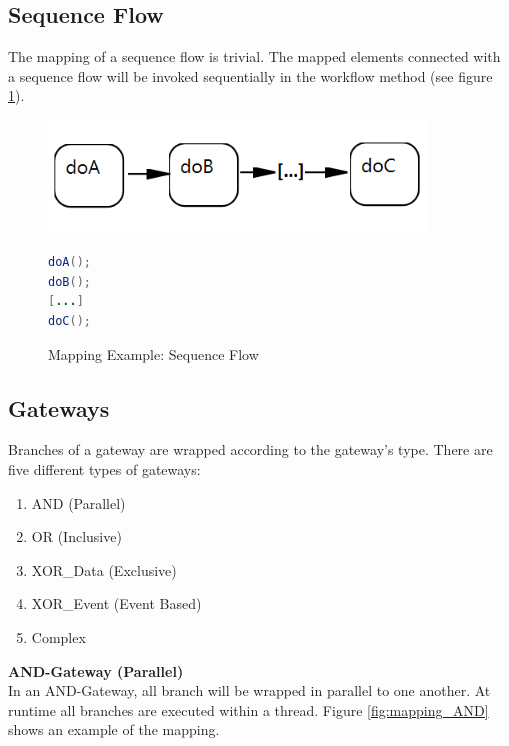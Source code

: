 \subsection{Sequence Flow}
The mapping of a sequence flow is trivial. The mapped elements connected with a sequence flow will be invoked sequentially in the workflow method (see figure \ref{fig:mapping_sequence}).

\begin{figure}[h]
\begin{minipage}[c]{0.5\textwidth}
\includegraphics[width=0.9\textwidth]{images/mapping/sequence.png}
\end{minipage}
\begin{minipage}[c]{0.5\textwidth}
\begin{lstlisting}[language=Java]
doA();
doB();
[...]
doC();
\end{lstlisting}
\end{minipage}
\caption{Mapping Example: Sequence Flow}%
\label{fig:mapping_sequence}%
\end{figure}

\subsection{Gateways}
Branches of a gateway are wrapped according to the gateway's type. There are five different types of gateways:
\begin{enumerate}
	\item AND (Parallel)
	\item OR (Inclusive)
	\item XOR\_Data (Exclusive)
	\item XOR\_Event (Event Based)
	\item Complex 
\end{enumerate}

\textbf{AND-Gateway (Parallel)}\\
In an AND-Gateway, all branch will be wrapped in parallel to one another. At runtime all branches are executed within a thread. 
Figure \ref{fig:mapping_AND} shows an example of the mapping. \\

